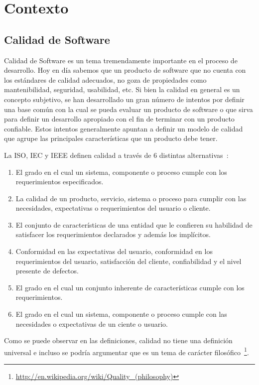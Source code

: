 
\chapter{Contexto}

\section{Calidad de Software}
Calidad de Software es un tema tremendamente importante en el proceso de desarrollo.
Hoy en día sabemos que un producto de software que no cuenta con los estándares de
calidad adecuados, no goza de propiedades como mantenibilidad, seguridad, usabilidad, etc.
Si bien la calidad en general es un concepto subjetivo, se han desarrollado un gran
número de intentos por definir una base común con la cual se pueda evaluar un producto 
de software o que sirva para definir un desarrollo apropiado con el fin de terminar
con un producto confiable. Estos intentos generalmente apuntan a definir un modelo
de calidad que agrupe las principales características que un producto debe tener.

La ISO, IEC y IEEE definen calidad a través de 6 distintas alternativas~\cite{5276043}:
\begin{enumerate}
    \item El grado en el cual un sistema, componente o proceso cumple con los requerimientos especificados.
    \item La calidad de un producto, servicio, sistema o proceso para cumplir con las necesidades, expectativas
    o requerimientos del usuario o cliente.
    \item El conjunto de características de una entidad que le confieren su habilidad de satisfacer los requerimientos
    declarados y además los implícitos.
    \item Conformidad en las expectativas del usuario, conformidad en los requerimientos del usuario, satisfacción del cliente,
    confiabilidad y el nivel presente de defectos.
    \item El grado en el cual un conjunto inherente de características cumple con los requerimientos.
    \item El grado en el cual un sistema, componente o proceso cumple con las necesidades o expectativas de un ciente o usuario.
\end{enumerate}

Como se puede observar en las definiciones, calidad no tiene una definición universal e incluso se podría argumentar
que es un tema de carácter filosófico~\footnote{\url{http://en.wikipedia.org/wiki/Quality_(philosophy)}}.


